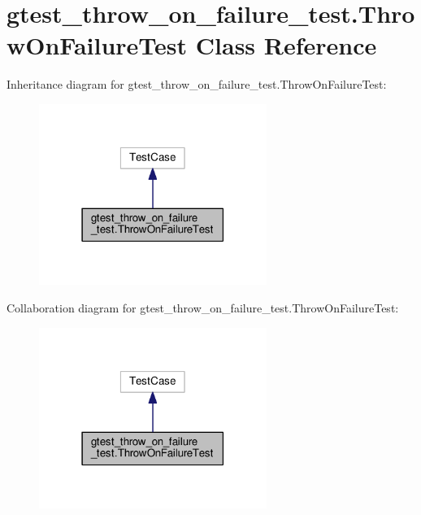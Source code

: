 \hypertarget{classgtest__throw__on__failure__test_1_1ThrowOnFailureTest}{}\section{gtest\+\_\+throw\+\_\+on\+\_\+failure\+\_\+test.\+Throw\+On\+Failure\+Test Class Reference}
\label{classgtest__throw__on__failure__test_1_1ThrowOnFailureTest}


Inheritance diagram for gtest\+\_\+throw\+\_\+on\+\_\+failure\+\_\+test.\+Throw\+On\+Failure\+Test\+:
\nopagebreak
\begin{figure}[H]
\begin{center}
\leavevmode
\includegraphics[width=210pt]{classgtest__throw__on__failure__test_1_1ThrowOnFailureTest__inherit__graph}
\end{center}
\end{figure}


Collaboration diagram for gtest\+\_\+throw\+\_\+on\+\_\+failure\+\_\+test.\+Throw\+On\+Failure\+Test\+:
\nopagebreak
\begin{figure}[H]
\begin{center}
\leavevmode
\includegraphics[width=210pt]{classgtest__throw__on__failure__test_1_1ThrowOnFailureTest__coll__graph}
\end{center}
\end{figure}
